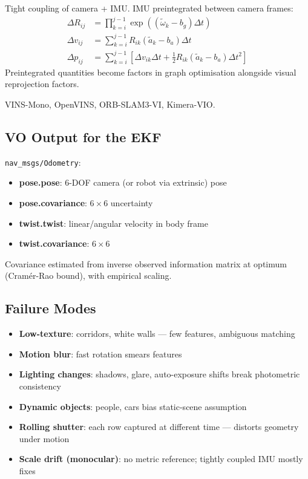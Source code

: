 \documentclass[11pt,a4paper]{article}
\begin{document}
Tight coupling of camera + IMU. IMU preintegrated between camera frames:
\begin{align}
\Delta R_{ij} &= \prod_{k=i}^{j-1} \exp((\tilde{\omega}_k - b_g)\Delta t) \\
\Delta v_{ij} &= \sum_{k=i}^{j-1} R_{ik}(\tilde{a}_k - b_a)\Delta t \\
\Delta p_{ij} &= \sum_{k=i}^{j-1}\left[\Delta v_{ik}\Delta t + \tfrac{1}{2}R_{ik}(\tilde{a}_k - b_a)\Delta t^2\right]
\end{align}
Preintegrated quantities become factors in graph optimisation alongside visual reprojection factors.

VINS-Mono, OpenVINS, ORB-SLAM3-VI, Kimera-VIO.

\subsection{VO Output for the EKF}

\texttt{nav\_msgs/Odometry}:
\begin{itemize}
\item \textbf{pose.pose}: 6-DOF camera (or robot via extrinsic) pose
\item \textbf{pose.covariance}: $6 \times 6$ uncertainty
\item \textbf{twist.twist}: linear/angular velocity in body frame
\item \textbf{twist.covariance}: $6 \times 6$
\end{itemize}

Covariance estimated from inverse observed information matrix at optimum (Cramér-Rao bound), with empirical scaling.

\subsection{Failure Modes}

\begin{itemize}
\item \textbf{Low-texture}: corridors, white walls --- few features, ambiguous matching
\item \textbf{Motion blur}: fast rotation smears features
\item \textbf{Lighting changes}: shadows, glare, auto-exposure shifts break photometric consistency
\item \textbf{Dynamic objects}: people, cars bias static-scene assumption
\item \textbf{Rolling shutter}: each row captured at different time --- distorts geometry under motion
\item \textbf{Scale drift (monocular)}: no metric reference; tightly coupled IMU mostly fixes
\end{itemize}
\end{document}
